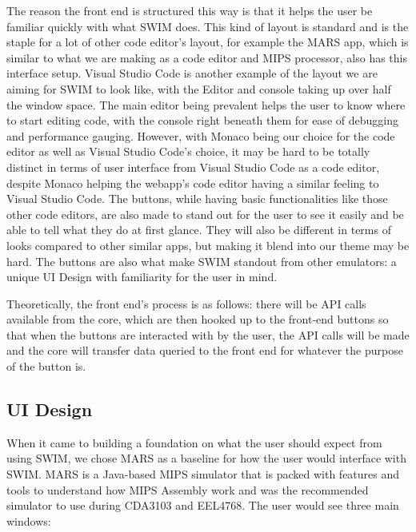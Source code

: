 \documentclass[parskip=half, fontsize=12pt]{scrartcl}
\begin{document}
The reason the front end is structured this way is that it helps the
user be familiar quickly with what SWIM does. This kind of layout is
standard and is the staple for a lot of other code editor's layout, for
example the MARS app, which is similar to what we are making as a code
editor and MIPS processor, also has this interface setup. Visual Studio
Code is another example of the layout we are aiming for SWIM to look
like, with the Editor and console taking up over half the window space.
The main editor being prevalent helps the user to know where to start
editing code, with the console right beneath them for ease of debugging
and performance gauging. However, with Monaco being our choice for the
code editor as well as Visual Studio Code's choice, it may be hard to be
totally distinct in terms of user interface from Visual Studio Code as a
code editor, despite Monaco helping the webapp's code editor having a
similar feeling to Visual Studio Code. The buttons, while having basic
functionalities like those other code editors, are also made to stand
out for the user to see it easily and be able to tell what they do at
first glance. They will also be different in terms of looks compared to
other similar apps, but making it blend into our theme may be hard. The
buttons are also what make SWIM standout from other emulators: a unique
UI Design with familiarity for the user in mind.

Theoretically, the front end's process is as follows: there will be API
calls available from the core, which are then hooked up to the front-end
buttons so that when the buttons are interacted with by the user, the
API calls will be made and the core will transfer data queried to the
front end for whatever the purpose of the button is.

\subsection{UI Design}
\label{subsec:ui-design}

When it came to building a foundation on what the user should expect
from using SWIM, we chose MARS as a baseline for how the user would
interface with SWIM. MARS is a Java-based MIPS simulator that is packed
with features and tools to understand how MIPS Assembly work and was the
recommended simulator to use during CDA3103 and EEL4768. The user would
see three main windows:
\end{document}
